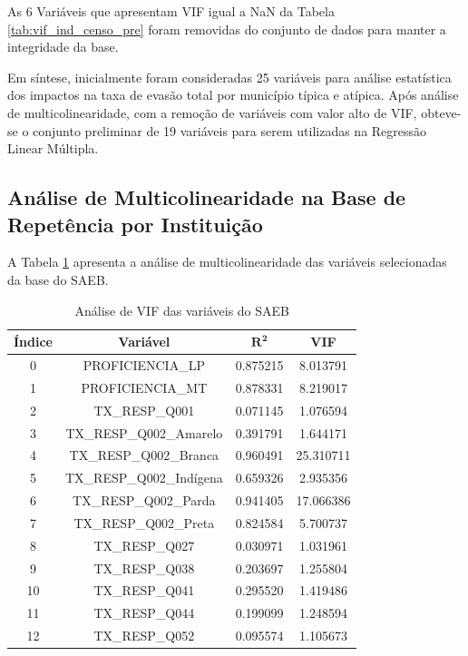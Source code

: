\documentclass[english, spanish, brazilian]{RBIEarticle} %
\begin{document}
As 6 Variáveis que apresentam VIF igual a NaN da Tabela \ref{tab:vif_ind_censo_pre} foram removidas do conjunto de dados para manter a integridade da base.

Em síntese, inicialmente foram consideradas 25 variáveis para análise estatística dos impactos na taxa de evasão total por município típica e atípica. Após análise de multicolinearidade, com a remoção de variáveis com valor alto de VIF, obteve-se o conjunto preliminar de 19 variáveis para serem utilizadas na Regressão Linear Múltipla.

\subsection{Análise de Multicolinearidade na Base de Repetência por Instituição}

A Tabela \ref{tab:vif_rep_pre} apresenta a análise de multicolinearidade das variáveis selecionadas da base do SAEB.

\begin{table}[H]
\centering
\begin{tabular}{cccc}
\hline
\textbf{Índice} & \textbf{Variável} & $\mathbf{R^2}$ & \textbf{VIF} \\
\hline
0 & PROFICIENCIA\_LP & 0.875215 & 8.013791 \\
1 & PROFICIENCIA\_MT & 0.878331 & 8.219017 \\
2 & TX\_RESP\_Q001 & 0.071145 & 1.076594 \\
3 & TX\_RESP\_Q002\_Amarelo & 0.391791 & 1.644171 \\
4 & TX\_RESP\_Q002\_Branca & 0.960491 & 25.310711 \\
5 & TX\_RESP\_Q002\_Indígena & 0.659326 & 2.935356 \\
6 & TX\_RESP\_Q002\_Parda & 0.941405 & 17.066386 \\
7 & TX\_RESP\_Q002\_Preta & 0.824584 & 5.700737 \\
8 & TX\_RESP\_Q027 & 0.030971 & 1.031961 \\
9 & TX\_RESP\_Q038 & 0.203697 & 1.255804 \\
10 & TX\_RESP\_Q041 & 0.295520 & 1.419486 \\
11 & TX\_RESP\_Q044 & 0.199099 & 1.248594 \\
12 & TX\_RESP\_Q052 & 0.095574 & 1.105673 \\
\hline
\end{tabular}
\caption{Análise de VIF das variáveis do SAEB}
\label{tab:vif_rep_pre}
\end{table}
\end{document}
